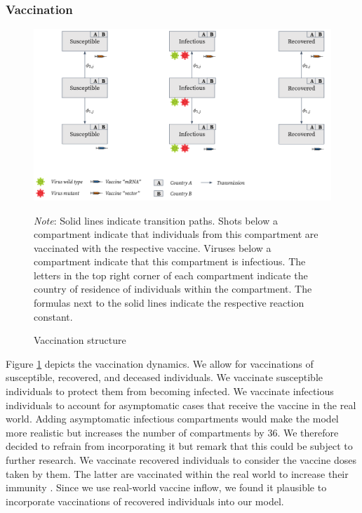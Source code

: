 \subsubsection{Vaccination}
\begin{figure}[h!]
\centering
\includegraphics[scale=0.3]{images/overview_vaccination.png}\\
\begin{flushleft}
\scriptsize{\textit{Note}: Solid lines indicate transition paths. Shots below a compartment indicate that individuals from this compartment are vaccinated with the respective vaccine. Viruses below a compartment indicate that this compartment is infectious. The letters in the top right corner of each compartment indicate the country of residence of individuals within the compartment. The formulas next to the solid lines indicate the respective reaction constant.}
\end{flushleft}
\caption{Vaccination structure}
\label{fig:model_vaccination_ov}
\end{figure}
Figure \ref{fig:model_vaccination_ov} depicts the vaccination dynamics. We allow for vaccinations of susceptible, recovered, and deceased individuals. We vaccinate susceptible individuals to protect them from becoming infected. We vaccinate infectious individuals to account for asymptomatic cases \citep{Byambasuren.2020} that receive the vaccine in the real world. Adding asymptomatic infectious compartments would make the model more realistic but increases the number of compartments by 36. We therefore decided to refrain from incorporating it but remark that this could be subject to further research. We vaccinate recovered individuals to consider the vaccine doses taken by them. The latter are vaccinated within the real world to increase their immunity \citep{Skelly.2021}. Since we use real-world vaccine inflow, we found it plausible to incorporate vaccinations of recovered individuals into our model.\\

